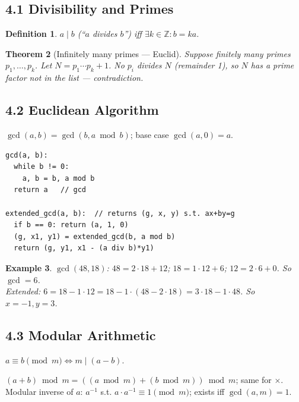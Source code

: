 \documentclass[11pt]{article}
\newtheorem{definition}{Definition}[section]
\newtheorem{example}[definition]{Example}
\newtheorem{theorem}[definition]{Theorem}
\newcommand{\Z}{\mathbb{Z}}
\newcommand{\divides}{\mid}
\begin{document}
\subsection*{4.1 Divisibility and Primes}

\begin{definition}
$a\divides b$ (``$a$ divides $b$'') iff $\exists k\in\Z: b=ka$.
\end{definition}

\begin{theorem}[Infinitely many primes — Euclid]
Suppose finitely many primes $p_1,\ldots,p_k$. Let $N=p_1\cdots p_k+1$. No $p_i$ divides $N$ (remainder 1), so $N$ has a prime factor not in the list — contradiction.
\end{theorem}

\subsection*{4.2 Euclidean Algorithm}

$\gcd(a,b)=\gcd(b,a\bmod b)$; base case $\gcd(a,0)=a$.

\begin{lstlisting}[caption={Euclidean / Extended Euclidean algorithm}]
gcd(a, b):
  while b != 0:
    a, b = b, a mod b
  return a   // gcd

extended_gcd(a, b):  // returns (g, x, y) s.t. ax+by=g
  if b == 0: return (a, 1, 0)
  (g, x1, y1) = extended_gcd(b, a mod b)
  return (g, y1, x1 - (a div b)*y1)
\end{lstlisting}

\begin{example}
$\gcd(48,18)$: $48=2\cdot18+12$; $18=1\cdot12+6$; $12=2\cdot6+0$. So $\gcd=6$.\\
Extended: $6=18-1\cdot12=18-1\cdot(48-2\cdot18)=3\cdot18-1\cdot48$. So $x=-1,y=3$.
\end{example}

\subsection*{4.3 Modular Arithmetic}

$a\equiv b\pmod m\Leftrightarrow m\divides(a-b)$.

\begin{tcolorbox}[keybox={Arithmetic mod $m$}]
$(a+b)\bmod m=((a\bmod m)+(b\bmod m))\bmod m$; same for $\times$.\\
Modular inverse of $a$: $a^{-1}$ s.t. $a\cdot a^{-1}\equiv 1\pmod m$; exists iff $\gcd(a,m)=1$.
\end{tcolorbox}
\end{document}
